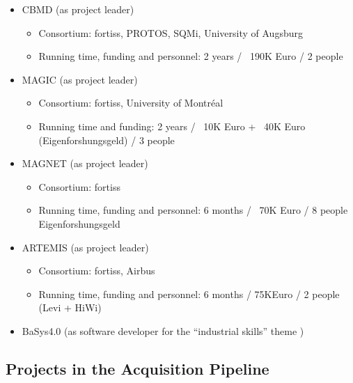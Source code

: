 \documentclass{article}
\begin{document}
\begin{appendices}
\begin{itemize}
  \item CBMD (as project leader)
  \begin{itemize}
    \item Consortium: fortiss, PROTOS, SQMi, University of Augsburg
    \item Running time, funding and personnel: 2 years / ~190K Euro / 2 people
  \end{itemize} 
  \item MAGIC (as project leader)
  \begin{itemize}
    \item Consortium: fortiss, University of Montréal
    \item Running time and funding: 2 years / ~10K Euro + ~40K Euro
    (Eigenforshungsgeld) / 3 people
  \end{itemize} 
  \item MAGNET (as project leader)
  \begin{itemize}
    \item Consortium: fortiss
    \item Running time, funding and personnel: 6 months / ~70K Euro / 8 people
    Eigenforshungsgeld
  \end{itemize}
  \item ARTEMIS (as project leader)
  \begin{itemize}
    \item Consortium: fortiss, Airbus
    \item Running time, funding and personnel: 6 months / 75KEuro / 2 people
    (Levi + HiWi)
  \end{itemize} 
  \item BaSys4.0 (as software developer for the ``industrial skills'' theme )
\end{itemize}

\subsection{Projects in the Acquisition Pipeline}
\label{section:projects_in_pipepline}


\end{appendices}
\end{document}
